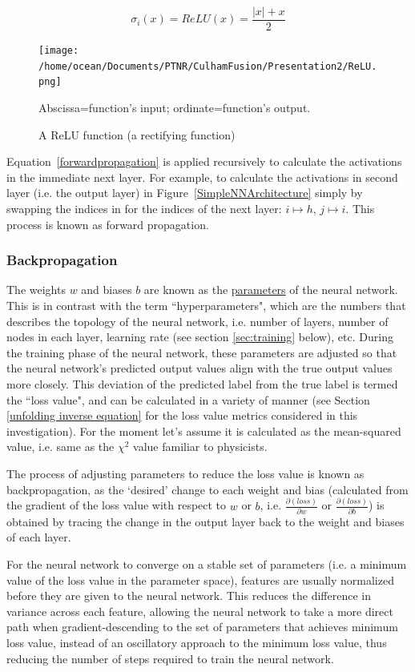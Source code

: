 \documentclass[a4paper, 12pt]{article}
\begin{document}
\begin{equation}
    \sigma_i(x) = ReLU(x) = \frac{|x|+x}{2}
\end{equation}
\begin{figure}
    \centering
    \texttt{[image: /home/ocean/Documents/PTNR/CulhamFusion/Presentation2/ReLU.png]}
    \caption{A ReLU function (a rectifying function)}\label{ReLU}
    Abscissa=function's input; ordinate=function's output.
\end{figure}

Equation~\ref{forwardpropagation} is applied recursively to calculate the activations in the immediate next layer. For example, to calculate the activations in second layer (i.e. the output layer) in Figure~\ref{SimpleNNArchitecture} simply by swapping the indices in for the indices of the next layer: $i\mapsto h$, $j\mapsto i$. This process is known as forward propagation.

\subsubsection{Backpropagation}
    The weights $w$ and biases $b$ are known as the \underline{parameters} of the neural network. This is in contrast with the term ``hyperparameters", which are the numbers that describes the topology of the neural network, i.e. number of layers, number of nodes in each layer, learning rate (see section \ref{sec:training} below), etc. During the training phase of the neural network, these parameters are adjusted so that the neural network's predicted output values align with the true output values more closely. This deviation of the predicted label from the true label is termed the ``loss value", and can be calculated in a variety of manner (see Section \ref{unfolding inverse equation} for the loss value metrics considered in this investigation). For the moment let's assume it is calculated as the mean-squared value, i.e. same as the $\chi^2$ value familiar to physicists.

    The process of adjusting parameters to reduce the loss value is known as backpropagation, as the `desired' change to each weight and bias (calculated from the gradient of the loss value with respect to $w$ or $b$, i.e. $\frac{\partial (loss)}{\partial w}$ or $\frac{\partial (loss)}{\partial b}$) is obtained by tracing the change in the output layer back to the weight and biases of each layer.

    For the neural network to converge on a stable set of parameters (i.e. a minimum value of the loss value in the parameter space), features are usually normalized before they are given to the neural network. This reduces the difference in variance across each feature, allowing the neural network to take a more direct path when gradient-descending to the set of parameters that achieves minimum loss value, instead of an oscillatory approach to the minimum loss value\cite{AndrewNgNormalization}, thus reducing the number of steps required to train the neural network.
\end{document}
